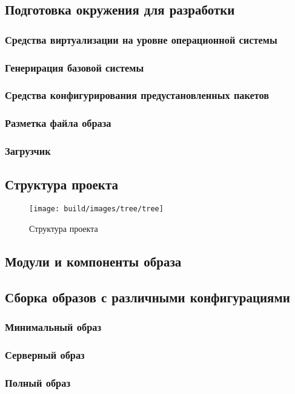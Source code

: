 \subsection{Подготовка окружения для разработки}
\newpage
\subsubsection{Средства виртуализации на уровне операционной системы}
\newpage
\subsubsection{Генерирация базовой системы}
\newpage
\subsubsection{Средства конфигурирования предустановленных пакетов}
\newpage
\subsubsection{Разметка файла образа}
\newpage
\subsubsection{Загрузчик}
\newpage
\subsection{Структура проекта}

\begin{figure}[h!]
  \centering
  \setlength{\fboxsep}{5pt}
  \texttt{[image: build/images/tree/tree]}
  \vspace*{6pt}
  \caption{Структура проекта}\label{fig:project-tree}
\end{figure}

\newpage
\subsection{Модули и компоненты образа}
\newpage
\subsection{Сборка образов с различными конфигурациями}
\subsubsection{Минимальный образ}
\subsubsection{Серверный образ}
\subsubsection{Полный образ}
\newpage
